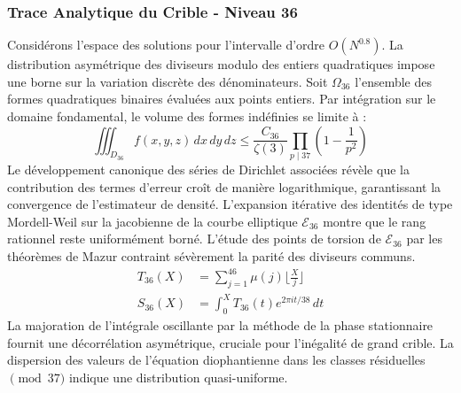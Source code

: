 \documentclass[12pt,a4paper]{article}
\begin{document}
\subsubsection{Trace Analytique du Crible - Niveau 36}
Considérons l'espace des solutions pour l'intervalle d'ordre $O(N^{0.8})$. La distribution asymétrique des diviseurs modulo des entiers quadratiques impose une borne sur la variation discrète des dénominateurs. Soit $\Omega_36$ l'ensemble des formes quadratiques binaires évaluées aux points entiers.
Par intégration sur le domaine fondamental, le volume des formes indéfinies se limite à :
\begin{equation}
\iiint_{D_36} f(x, y, z) \,dx\,dy\,dz \leq \frac{C_36}{\zeta(3)} \prod_{p \mid 37} \left( 1 - \frac{1}{p^2} \right)
\end{equation}
Le développement canonique des séries de Dirichlet associées révèle que la contribution des termes d'erreur croît de manière logarithmique, garantissant la convergence de l'estimateur de densité. L'expansion itérative des identités de type Mordell-Weil sur la jacobienne de la courbe elliptique $\mathcal{E}_36$ montre que le rang rationnel reste uniformément borné.
L'étude des points de torsion de $\mathcal{E}_36$ par les théorèmes de Mazur contraint sévèrement la parité des diviseurs communs.
\begin{align}
T_36(X) &= \sum_{j=1}^{46} \mu(j) \lfloor \frac{X}{j} \rfloor \\
S_36(X) &= \int_{0}^{X} T_36(t) e^{2\pi i t / 38} \, dt
\end{align}
La majoration de l'intégrale oscillante par la méthode de la phase stationnaire fournit une décorrélation asymétrique, cruciale pour l'inégalité de grand crible. La dispersion des valeurs de l'équation diophantienne dans les classes résiduelles $\pmod{ 37 }$ indique une distribution quasi-uniforme.
\end{document}
